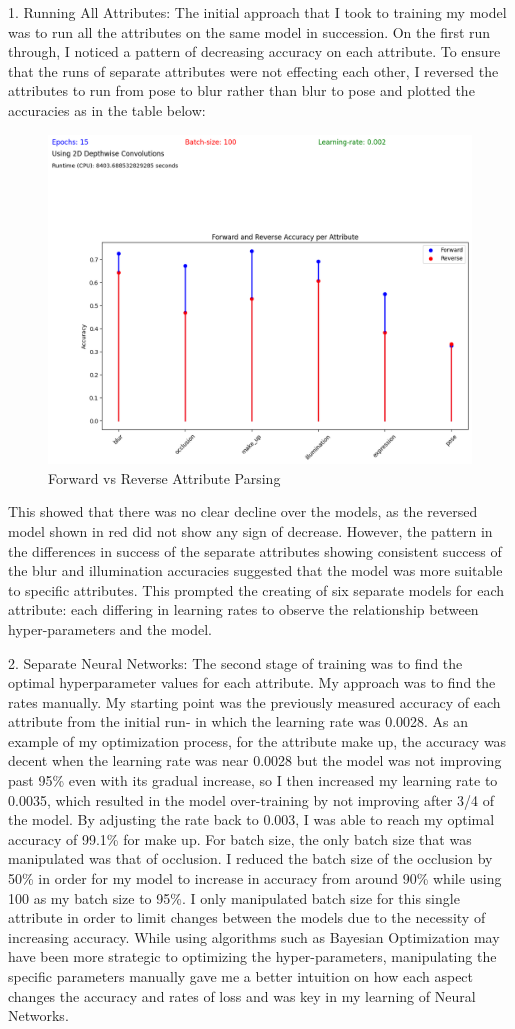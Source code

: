 \documentclass{article}
\begin{document}
1. Running All Attributes: The initial approach that I took to training my model was to run all the attributes on the same model in succession. On the first run through, I noticed a pattern of decreasing accuracy on each attribute. To ensure that the runs of separate attributes were not effecting each other, I reversed the attributes to run from pose to blur rather than blur to pose and plotted the accuracies as in the table below: 
\begin{figure}[h]
    \centering
    \includegraphics[width=0.5\linewidth]{15-epoch-fvr3.png}
    \caption{Forward vs Reverse Attribute Parsing}
    \label{fig:placeholder}
\end{figure} 
This showed that there was no clear decline over the models, as the reversed model shown in red did not show any sign of decrease. However, the pattern in the differences in success of the separate attributes showing consistent success of the blur and illumination accuracies suggested that the model was more suitable to specific attributes. This prompted the creating of six separate models for each attribute: each differing in learning rates to observe the relationship between hyper-parameters and the model. 

2. Separate Neural Networks: The second stage of training was to find the optimal hyperparameter values for each attribute. My approach was to find the rates manually.  My starting point was the previously measured accuracy of each attribute from the initial run- in which the learning rate was 0.0028. As an example of my optimization process, for the attribute make up, the accuracy was decent when the learning rate was near 0.0028 but the model was not improving past 95\% even with its gradual increase, so I then increased my learning rate to 0.0035, which resulted in the model over-training by not improving after 3/4 of the model. By adjusting the rate back to 0.003, I was able to reach my optimal accuracy of 99.1\% for make up. For batch size, the only batch size that was manipulated was that of occlusion. I reduced the batch size of the occlusion by 50\% in order for my model to increase in accuracy from around 90\% while using 100 as my batch size to 95\%. I only manipulated batch size for this single attribute in order to limit changes between the models due to the necessity of increasing accuracy.  While using algorithms such as Bayesian Optimization may have been more strategic to optimizing the hyper-parameters, manipulating the specific parameters manually gave me a better intuition on how each aspect changes the accuracy and rates of loss and was key in my learning of Neural Networks.
\end{document}
